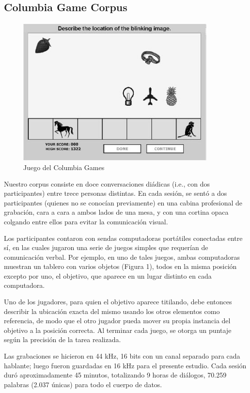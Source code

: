 \subsection{Columbia Game Corpus}

\begin{figure}
\centering
\includegraphics[width=10cm]{images/columbia_games.jpg}
\caption{Juego del Columbia Games}
\end{figure}

Nuestro corpus consiste en doce conversaciones diádicas (i.e., con dos participantes) entre trece personas distintas. En cada sesión, se sentó a dos participantes (quienes no se conocían previamente) en una cabina profesional de grabación, cara a cara a ambos lados de una mesa, y con una cortina opaca colgando entre ellos para evitar la comunicación visual.

Los participantes contaron con sendas computadoras portátiles conectadas entre sí, en las cuales jugaron una serie de juegos simples que requerían de comunicación verbal. Por ejemplo, en uno de tales juegos, ambas computadoras muestran un tablero con varios
objetos (Figura 1), todos en la misma posición excepto por uno, el objetivo, que aparece en un lugar distinto en cada computadora.

Uno de los jugadores, para quien el objetivo aparece titilando, debe entonces describir la ubicación exacta del mismo usando los
otros elementos como referencia, de modo que el otro jugador pueda mover su propia instancia del objetivo a la posición correcta. Al terminar cada juego, se otorga un puntaje según la precisión de la tarea realizada.

Las grabaciones se hicieron en 44 kHz, 16 bits con un canal separado para cada hablante; luego fueron guardadas en 16 kHz para el presente estudio. Cada sesión duró aproximadamente 45 minutos, totalizando 9 horas de diálogos, 70.259 palabras (2.037 únicas) para todo el cuerpo de datos.
